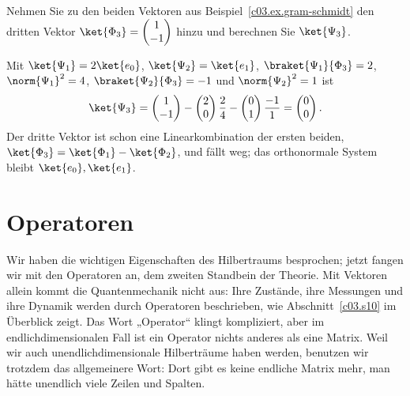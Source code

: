 \begin{exercise}\label{c03.exc.gram-schmidt}
  Nehmen Sie zu den beiden Vektoren aus Beispiel~\ref{c03.ex.gram-schmidt} den dritten Vektor
  $\ket{\Phi_3} = \begin{pmatrix} 1 \\ -1 \end{pmatrix}$ hinzu und berechnen Sie $\ket{\Psi_3}$.
\end{exercise}
\begin{solution}
  Mit $\ket{\Psi_1} = 2\ket{e_0}$, $\ket{\Psi_2} = \ket{e_1}$, $\braket{\Psi_1}{\Phi_3} = 2$,
  $\norm{\Psi_1}^2 = 4$, $\braket{\Psi_2}{\Phi_3} = -1$ und $\norm{\Psi_2}^2 = 1$ ist
  \begin{equation}\label{c03.eq.gs-null}
    \ket{\Psi_3} = \begin{pmatrix} 1 \\ -1 \end{pmatrix} - \begin{pmatrix} 2 \\ 0 \end{pmatrix} \frac{2}{4}
    - \begin{pmatrix} 0 \\ 1 \end{pmatrix} \frac{-1}{1} = \begin{pmatrix} 0 \\ 0 \end{pmatrix} .
  \end{equation}
  Der dritte Vektor ist schon eine Linearkombination der ersten beiden,
  $\ket{\Phi_3} = \ket{\Phi_1} - \ket{\Phi_2}$, und fällt weg; das orthonormale System bleibt
  $\ket{e_0}, \ket{e_1}$.
\end{solution}

\section{Operatoren}\label{c03.s8}

Wir haben die wichtigen Eigenschaften des Hilbertraums besprochen; jetzt fangen wir mit den
Operatoren an, dem zweiten Standbein der Theorie. Mit Vektoren allein kommt die Quantenmechanik
nicht aus: Ihre Zustände, ihre Messungen und ihre Dynamik werden durch Operatoren beschrieben,
wie Abschnitt~\ref{c03.s10} im Überblick zeigt. Das Wort „Operator“ klingt kompliziert, aber im
endlichdimensionalen Fall ist ein Operator nichts anderes als eine Matrix. Weil wir auch
unendlichdimensionale Hilberträume haben werden, benutzen wir trotzdem das allgemeinere Wort:
Dort gibt es keine endliche Matrix mehr, man hätte unendlich viele Zeilen und Spalten.

